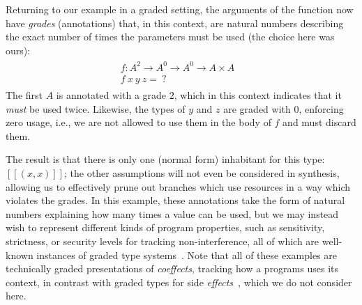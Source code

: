 Returning to our example in a graded setting, the arguments of the function now
have \emph{grades} (annotations) that, in this context, are natural numbers
describing the exact number of times the parameters must be used (the choice
here was ours):
%
\begin{align*}
  \begin{array}{ll}
    f : A^{2} \rightarrow A^{0} \rightarrow A^{0} \rightarrow A \times A &
    \\
    f\ x\ y\ z =\ ? &
  \end{array}
\end{align*}
The first $A$ is annotated with a grade $2$, which in this context indicates that it
\textit{must} be used twice. Likewise, the types of $y$ and $z$
are graded with $0$, enforcing zero usage, i.e., we are not allowed
to use them in the body of $f$ and must discard them.

The result is that there is only one (normal form) inhabitant for this type: $[[
(x, x) ]]$; the other assumptions will not even be considered in synthesis,
allowing us to effectively prune out branches which use resources in a way which
violates the grades. In this example, these annotations take the form of natural
numbers explaining how many times a value can be used, but we may instead wish
to represent different kinds of program properties, such as sensitivity,
strictness, or security levels for tracking non-interference, all of which are
well-known instances of graded type
systems~\citep{DBLP:journals/pacmpl/OrchardLE19,DBLP:conf/icfp/GaboardiKOBU16,DBLP:journals/pacmpl/AbelB20}.
Note that all of these examples are technically graded presentations of
\emph{coeffects}, tracking how a programs uses its context, in contrast with
graded types for side
\emph{effects}~\citep{DBLP:journals/corr/OrchardPM14,DBLP:conf/popl/Katsumata14},
which we do not consider here.

